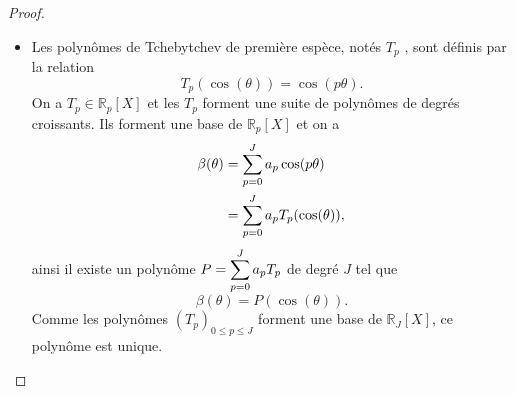 \begin{proof}
\begin{itemize}
\item Les polynômes de Tchebytchev de première espèce, notés $T_p$ , sont définis par la relation
\begin{equation}
T_p(\cos (\theta)) = \cos (p \theta).
\end{equation}
On a $T_p \in \mathbb{R}_p[X]$ et les $T_p$ forment une suite de polynômes de degrés croissants. Ils forment une base de $\mathbb{R}_p[X]$ et on a
\begin{align*}
\beta(\theta) & = \displaystyle\sum\limits_{p=0}^J a_p \cos (p \theta) \\
	& = \displaystyle\sum\limits_{p=0}^J a_p T_p( \cos (\theta)),
\end{align*}
ainsi il existe un polynôme $P = \displaystyle\sum\limits_{p=0}^J a_p T_p$ de degré $J$ tel que
\begin{equation}
\beta(\theta) = P(\cos (\theta)).
\end{equation}
Comme les polynômes $(T_p)_{0 \leq p \leq J}$ forment une base de $\mathbb{R}_{J}[X]$, ce polynôme est unique.


\end{itemize}
\end{proof}
